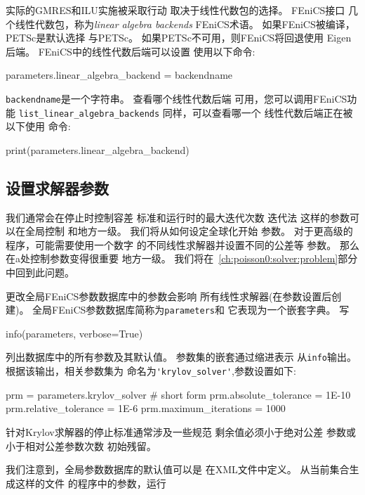 实际的GMRES和ILU实施被采取行动
取决于线性代数包的选择。 FEniCS接口
几个线性代数包，称为\emph{linear algebra backends}
FEniCS术语。 如果FEniCS被编译，PETSc是默认选择
与PETSc。 如果PETSc不可用，则FEniCS将回退使用
Eigen后端。 FEniCS中的线性代数后端可以设置
使用以下命令:

\begin{python}
parameters.linear_algebra_backend = backendname
\end{python}
\texttt{backendname}是一个字符串。 查看哪个线性代数后端
可用，您可以调用FEniCS功能
\verb!list_linear_algebra_backends! 同样，可以查看哪一个
线性代数后端正在被以下使用
命令:

\begin{python}
print(parameters.linear_algebra_backend)
\end{python}


\subsection{设置求解器参数}

我们通常会在停止时控制容差
标准和运行时的最大迭代次数
迭代法 这样的参数可以在全局控制
和地方一级。 我们将从如何设定全球化开始
参数。 对于更高级的程序，可能需要使用一个数字
的不同线性求解器并设置不同的公差等
参数。 那么在a处控制参数变得很重要
地方一级。 我们将在~\ref{ch:poisson0:solver:problem}部分中回到此问题。

更改全局FEniCS参数数据库中的参数会影响
所有线性求解器(在参数设置后创建)。
全局FEniCS参数数据库简称为\texttt{parameters}和
它表现为一个嵌套字典。 写

\begin{python}
info(parameters, verbose=True)
\end{python}
列出数据库中的所有参数及其默认值。
参数集的嵌套通过缩进表示
从\texttt{info}输出。
根据该输出，相关参数集为
命名为\verb!'krylov_solver'!,参数设置如下:

\begin{python}
prm = parameters.krylov_solver  # short form
prm.absolute_tolerance = 1E-10
prm.relative_tolerance = 1E-6
prm.maximum_iterations = 1000
\end{python}
针对Krylov求解器的停止标准通常涉及一些规范
剩余值必须小于绝对公差
参数或小于相对公差参数次数
初始残留。

我们注意到，全局参数数据库的默认值可以是
在XML文件中定义。 从当前集合生成这样的文件
的程序中的参数，运行

